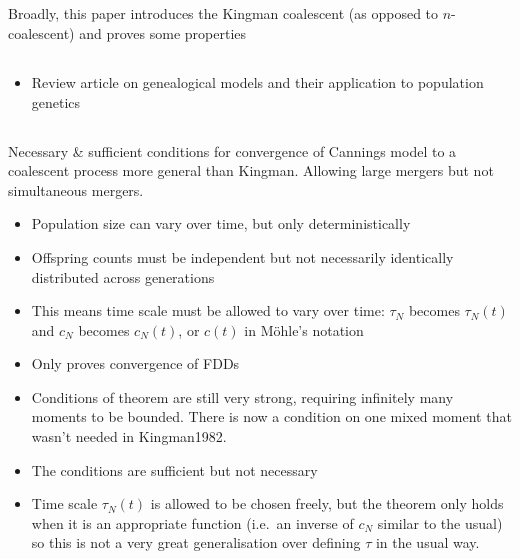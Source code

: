 \documentclass{article}
\begin{document}
\subsection*{\cite{kingman1982coal}}
Broadly, this paper introduces the Kingman coalescent (as opposed to $n$-coalescent) and proves some properties


\subsection*{\cite{tavare1984}}
\begin{itemize}
\item Review article on genealogical models and their application to population genetics
\end{itemize}


\subsection*{\cite{mohle1998}}
Necessary \& sufficient conditions for convergence of Cannings model to a coalescent process more general than Kingman. Allowing large mergers but not simultaneous mergers.
\begin{itemize}
\item Population size can vary over time, but only deterministically
\item Offspring counts must be independent but not necessarily identically distributed across generations
\item This means time scale must be allowed to vary over time: $\tau_N$ becomes $\tau_N(t)$ and $c_N$ becomes $c_N(t)$, or $c(t)$ in M\"ohle's notation
\item Only proves convergence of FDDs
\item Conditions of theorem are still very strong, requiring infinitely many moments to be bounded. There is now a condition on one mixed moment that wasn't needed in Kingman1982.
\item The conditions are sufficient but not necessary
\item Time scale $\tau_N(t)$ is allowed to be chosen freely, but the theorem only holds when it is an appropriate function (i.e.\ an inverse of $c_N$ similar to the usual) so this is not a very great generalisation over defining $\tau$ in the usual way.
\end{itemize}
\end{document}
